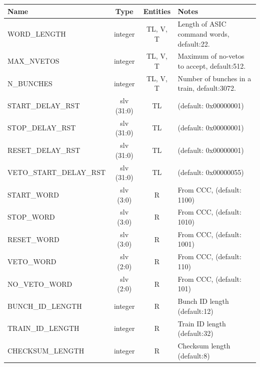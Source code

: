 \begin{table}[htbp]
  \begin{center}
    \begin{tabulary}{\textwidth}{l| c | c | L}
      Name                       & Type       & Entities       & Notes \\
      \hline
      WORD\_LENGTH               & integer    & TL, V, T        & Length of ASIC command words, default:22.    \\
      MAX\_NVETOS                & integer    & TL, V, T        & Maximum of no-vetos to accept, default:512.  \\
      N\_BUNCHES                 & integer    & TL, V, T        & Number of bunches in a train, default:3072.  \\ 
      \hline
      START\_DELAY\_RST          & slv (31:0) & TL              & (default: 0x00000001)                \\
      STOP\_DELAY\_RST           & slv (31:0) & TL              & (default: 0x00000001)                \\
      RESET\_DELAY\_RST          & slv (31:0) & TL              & (default: 0x00000001)                \\
      VETO\_START\_DELAY\_RST    & slv (31:0) & TL              & (default: 0x00000055)                \\
      \hline                                                        
      START\_WORD                & slv (3:0)  &  R              & From CCC, (default: 1100)           \\
      STOP\_WORD                 & slv (3:0)  &  R              & From CCC, (default: 1010)           \\
      RESET\_WORD                & slv (3:0)  &  R              & From CCC, (default: 1001)           \\
      VETO\_WORD                 & slv (2:0)  &  R              & From CCC, (default: 110)            \\
      NO\_VETO\_WORD             & slv (2:0)  &  R              & From CCC, (default: 101)            \\
      BUNCH\_ID\_LENGTH          & integer    &  R              & Bunch ID length (default:12)        \\
      TRAIN\_ID\_LENGTH          & integer    &  R              & Train ID length (default:32)        \\
      CHECKSUM\_LENGTH           & integer    &  R              & Checksum length (default:8)         \\

\end{tabulary}
\end{center}
\end{table}

